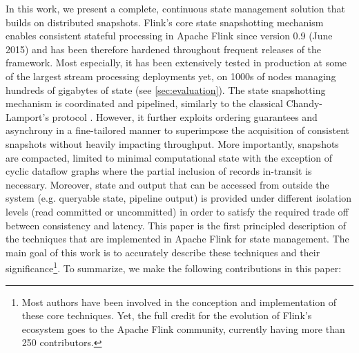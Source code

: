 



In this work, we present a complete, continuous state management solution that builds on distributed snapshots. Flink's core state snapshotting mechanism enables consistent stateful processing in Apache Flink since version 0.9 (June 2015) and has been therefore hardened throughout frequent releases of the framework. Most especially, it has been extensively tested in production at some of the largest stream processing deployments yet, on 1000s of nodes  managing hundreds of gigabytes of state (see \autoref{sec:evaluation}). 
The state snapshotting mechanism is coordinated and pipelined, similarly to the classical Chandy-Lamport's protocol \cite{chandy1985distributed}. However, it further exploits ordering guarantees and asynchrony in a fine-tailored manner to superimpose the acquisition of consistent snapshots without heavily impacting throughput. More importantly, snapshots are compacted, limited to minimal computational state with the exception of cyclic dataflow graphs where the partial inclusion of records in-transit is necessary. 
Moreover, state and output that can be accessed from outside the system (e.g. queryable state, pipeline output) is provided under different isolation levels (read committed or uncommitted) in order to satisfy the required trade off between consistency and latency. 
This paper is the first principled description of the techniques that are implemented in Apache Flink for state management. The main goal of this work is to accurately describe these techniques and their significance\footnote{Most authors have been involved in the conception and implementation of these core techniques. Yet, the full credit for the evolution of Flink's ecosystem goes to the Apache Flink community, currently having more than 250 contributors.}. To summarize, we make the following contributions in this paper:

